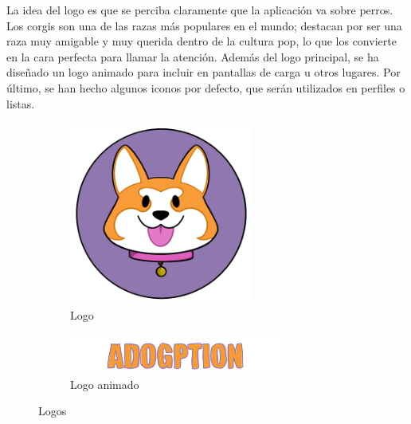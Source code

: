 \documentclass[a4paper, 12pt]{article}
\begin{document}
La idea del logo es que se perciba claramente que la aplicación va sobre perros. Los corgis son una de las razas más populares en el mundo; destacan por ser una raza muy amigable y muy querida dentro de la cultura pop, lo que los convierte en la cara perfecta para llamar la atención. Además del logo principal, se ha diseñado un logo animado para incluir en pantallas de carga u otros lugares. Por último, se han hecho algunos iconos por defecto, que serán utilizados en perfiles o listas.


\begin{figure}[H]
   	\begin{subfigure}{0.48\textwidth}
		\begin{center}
			{\includegraphics[width=6cm]{logo/Logo1.png}\par}
			\caption{Logo}
		\end{center}  
	\end{subfigure}\hfill
   	\begin{subfigure}{0.48\textwidth}
		\begin{center}
			{\includegraphics[width=7cm]{logo/ADOGPTIONFIXED.png}\par}
			\caption{Logo animado}
		\end{center}  
	\end{subfigure}\hfill
	\caption{Logos}
\end{figure}
\end{document}
